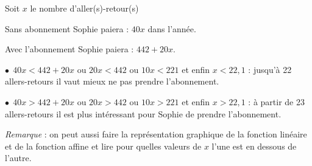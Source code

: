 \documentclass[10pt]{article}
\newcommand{\euro}{\eurologo{}}
\begin{document}
\setlength\parindent{0mm}
\pagestyle{fancy}
\thispagestyle{empty}
    
    
    




\medskip

%
%
%
Soit $x$ le nombre d'aller(s)-retour(s)

Sans abonnement Sophie paiera : $40x$ dans l'année.

Avec l'abonnement Sophie paiera : $442 + 20x$.

$\bullet~~$$40x < 442 + 20x$ ou $20x < 442$ ou $10x < 221$ et enfin $x < 22,1$ : jusqu'à 22 allers-retours il vaut mieux ne pas prendre l'abonnement.

$\bullet~~$$40x > 442 + 20x$ ou $20x > 442$ ou $10x > 221$ et enfin $x > 22,1$ : à partir de 23 allers-retours il est plus intéressant pour Sophie de prendre l'abonnement.

\emph{Remarque} : on peut aussi faire la représentation graphique de la fonction linéaire et de la fonction affine et lire pour quelles valeurs de $x$ l'une est en dessous de l'autre.
\end{document}
